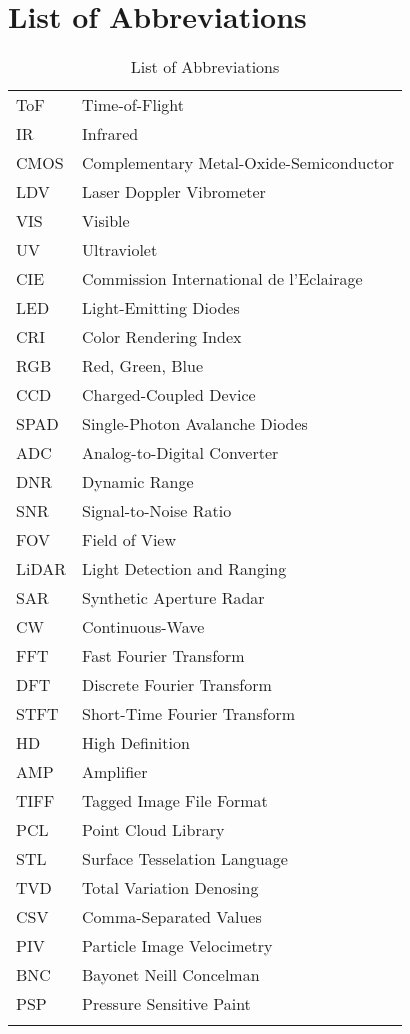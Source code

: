 \section*{List of Abbreviations}

\begin{longtable}[l]{p{150pt} p{300pt}}
ToF	& Time-of-Flight\\
IR & Infrared\\
CMOS & Complementary Metal-Oxide-Semiconductor\\
LDV & Laser Doppler Vibrometer\\
VIS & Visible\\
UV & Ultraviolet\\
CIE & Commission International de l'Eclairage\\
LED & Light-Emitting Diodes\\
CRI & Color Rendering Index\\
RGB & Red, Green, Blue\\
CCD & Charged-Coupled Device\\
SPAD & Single-Photon Avalanche Diodes\\
ADC & Analog-to-Digital Converter\\
DNR & Dynamic Range\\
SNR & Signal-to-Noise Ratio\\
FOV & Field of View\\
LiDAR & Light Detection and Ranging\\
SAR & Synthetic Aperture Radar\\
CW & Continuous-Wave\\
FFT & Fast Fourier Transform\\
DFT & Discrete Fourier Transform\\
STFT & Short-Time Fourier Transform\\
HD & High Definition\\
AMP & Amplifier\\
TIFF & Tagged Image File Format\\
PCL & Point Cloud Library\\
STL & Surface Tesselation Language\\
TVD & Total Variation Denosing\\
CSV & Comma-Separated Values\\
PIV & Particle Image Velocimetry\\
BNC & Bayonet Neill Concelman\\
PSP & Pressure Sensitive Paint\\ 

\caption{List of Abbreviations}
\end{longtable} 

\begin{table}
\vspace{1 mm}  
\end{table}

\begin{table}
\vspace{1 mm}
\end{table}
